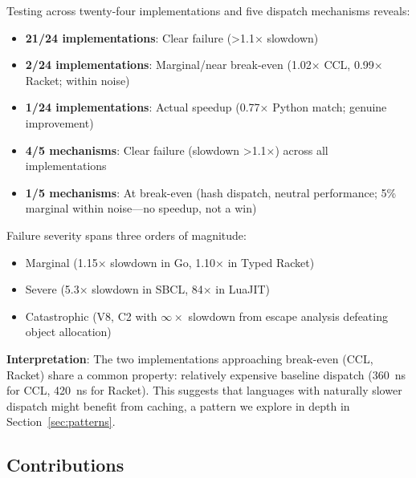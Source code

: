 \documentclass[sigplan,final,acmsmall,review,screen]{acmart}
\begin{document}
Testing across twenty-four implementations and five dispatch mechanisms reveals:
\begin{itemize}
  \item \textbf{21/24 implementations}: Clear failure (>1.1× slowdown)
  \item \textbf{2/24 implementations}: Marginal/near break-even (1.02× CCL, 0.99× Racket; within noise)
  \item \textbf{1/24 implementations}: Actual speedup (0.77× Python match; genuine improvement)
  \item \textbf{4/5 mechanisms}: Clear failure (slowdown >1.1×) across all implementations
  \item \textbf{1/5 mechanisms}: At break-even (hash dispatch, neutral performance; 5\% marginal within noise—no speedup, not a win)
\end{itemize}

Failure severity spans three orders of magnitude:
\begin{itemize}
  \item Marginal (1.15× slowdown in Go, 1.10× in Typed Racket)
  \item Severe (5.3× slowdown in SBCL, 84× in LuaJIT)
  \item Catastrophic (V8, C2 with $\infty \times$ slowdown from escape analysis defeating object allocation)
\end{itemize}

\textbf{Interpretation}: The two implementations approaching break-even (CCL, Racket) share a common property: relatively expensive
baseline dispatch (360~ns for CCL, 420~ns for Racket). This suggests that languages with naturally slower dispatch might benefit from caching,
a pattern we explore in depth in Section~\ref{sec:patterns}.

\subsection{Contributions}
\end{document}
